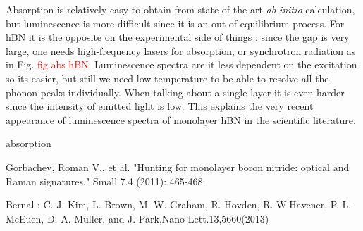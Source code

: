 Absorption is relatively easy to obtain from state-of-the-art \textit{ab initio} calculation, but luminescence is more difficult since it is an out-of-equilibrium process. For hBN it is the opposite on the experimental side of things : since the gap is very large, one needs high-frequency lasers for absorption, or synchrotron radiation as in Fig. \textcolor{red}{fig abs hBN}. Luminescence spectra are it less dependent on the excitation so its easier, but still we need low temperature to be able to resolve all the phonon peaks individually. When talking about a single layer it is even harder since the intensity of emitted light is low. This explains the very recent appearance of luminescence spectra of monolayer hBN in the scientific literature.

absorption 


Gorbachev, Roman V., et al. "Hunting for monolayer boron nitride: optical and Raman signatures." Small 7.4 (2011): 465-468.


Bernal :  C.-J.  Kim,  L.  Brown,  M.  W.  Graham,  R.  Hovden,  R.  W.Havener, P. L. McEuen, D. A. Muller, and J. Park,Nano Lett.13,5660(2013)


